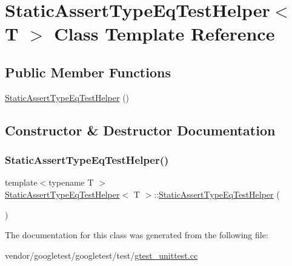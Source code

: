\hypertarget{class_static_assert_type_eq_test_helper}{}\section{Static\+Assert\+Type\+Eq\+Test\+Helper$<$ T $>$ Class Template Reference}
\label{class_static_assert_type_eq_test_helper}
\subsection*{Public Member Functions}
\begin{DoxyCompactItemize}
\item 
\hyperlink{class_static_assert_type_eq_test_helper_a9b567f0542f353d536119dae01e1ee1d}{Static\+Assert\+Type\+Eq\+Test\+Helper} ()
\end{DoxyCompactItemize}


\subsection{Constructor \& Destructor Documentation}
\mbox{\label{class_static_assert_type_eq_test_helper_a9b567f0542f353d536119dae01e1ee1d}} 
\subsubsection{\texorpdfstring{Static\+Assert\+Type\+Eq\+Test\+Helper()}{StaticAssertTypeEqTestHelper()}}
{\footnotesize\ttfamily template$<$typename T $>$ \\
\hyperlink{class_static_assert_type_eq_test_helper}{Static\+Assert\+Type\+Eq\+Test\+Helper}$<$ T $>$\+::\hyperlink{class_static_assert_type_eq_test_helper}{Static\+Assert\+Type\+Eq\+Test\+Helper} (\begin{DoxyParamCaption}{ }\end{DoxyParamCaption})\hspace{0.3cm}{\ttfamily [inline]}}



The documentation for this class was generated from the following file\+:\begin{DoxyCompactItemize}
\item 
vendor/googletest/googletest/test/\hyperlink{gtest__unittest_8cc}{gtest\+\_\+unittest.\+cc}\end{DoxyCompactItemize}
